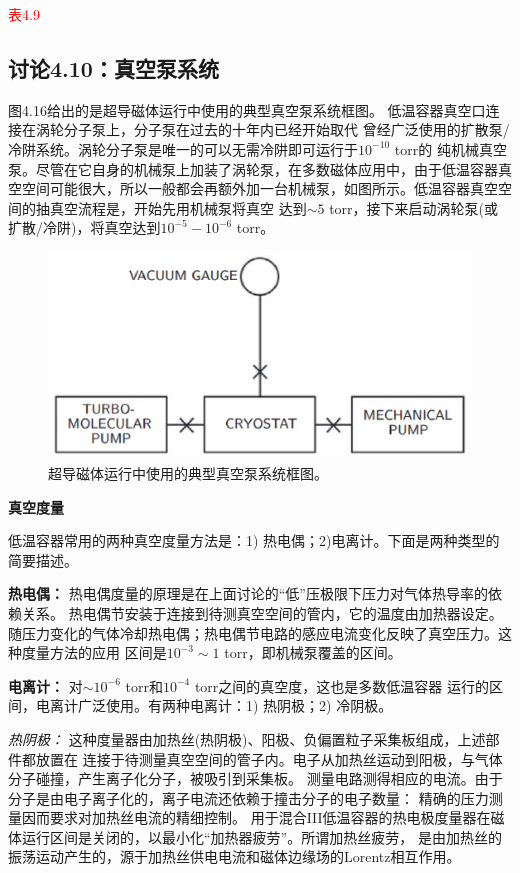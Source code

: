 \textcolor{red}{表4.9}


\subsection{讨论4.10：真空泵系统}

图4.16给出的是超导磁体运行中使用的典型真空泵系统框图。
低温容器真空口连接在涡轮分子泵上，分子泵在过去的十年内已经开始取代
曾经广泛使用的扩散泵/冷阱系统。涡轮分子泵是唯一的可以无需冷阱即可运行于$10^{−10}$ torr的
纯机械真空泵。尽管在它自身的机械泵上加装了涡轮泵，在多数磁体应用中，由于低温容器真空空间可能很大，所以一般都会再额外加一台机械泵，如图所示。低温容器真空空间的抽真空流程是，开始先用机械泵将真空
达到$\sim 5$ torr，接下来启动涡轮泵(或扩散/冷阱)，将真空达到$10^{-5}-10^{-6}$ torr。
\begin{figure}[htbp]
	\centering
	\includegraphics[scale=0.6]{chpt4/figs/fig4.16.eps}
	\caption{超导磁体运行中使用的典型真空泵系统框图。}
\end{figure}

\textbf{真空度量}

低温容器常用的两种真空度量方法是：1) 热电偶；2)电离计。下面是两种类型的简要描述。

\textbf{热电偶：} 热电偶度量的原理是在上面讨论的“低”压极限下压力对气体热导率的依赖关系。
热电偶节安装于连接到待测真空空间的管内，它的温度由加热器设定。
随压力变化的气体冷却热电偶；热电偶节电路的感应电流变化反映了真空压力。这种度量方法的应用
区间是$10^{-3}\sim 1$ torr，即机械泵覆盖的区间。

\textbf{电离计：} 对$\sim 10^{-6}$ torr和$10^{-4}$ torr之间的真空度，这也是多数低温容器
运行的区间，电离计广泛使用。有两种电离计：1) 热阴极；2) 冷阴极。

\textit{热阴极：} 这种度量器由加热丝(热阴极)、阳极、负偏置粒子采集板组成，上述部件都放置在
连接于待测量真空空间的管子内。电子从加热丝运动到阳极，与气体分子碰撞，产生离子化分子，被吸引到采集板。
测量电路测得相应的电流。由于分子是由电子离子化的，离子电流还依赖于撞击分子的电子数量：
精确的压力测量因而要求对加热丝电流的精细控制。
用于混合III低温容器的热电极度量器在磁体运行区间是关闭的，以最小化“加热器疲劳”。所谓加热丝疲劳，
是由加热丝的振荡运动产生的，源于加热丝供电电流和磁体边缘场的Lorentz相互作用。

